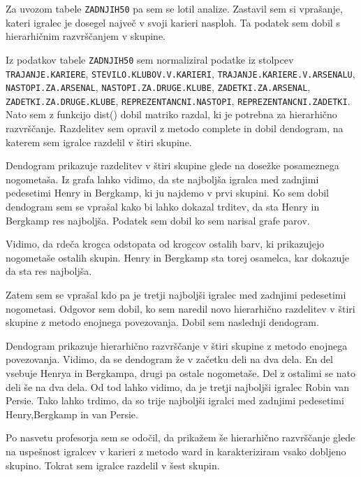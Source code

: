 \documentclass[11pt,a4paper]{article}
\begin{document}
Za uvozom tabele \verb|ZADNJIH50| pa sem se lotil analize. Zastavil sem si vprašanje, kateri igralec je dosegel največ v svoji karieri nasploh. Ta podatek sem dobil s hierarhičnim razvrščanjem v skupine.

Iz podatkov tabele \verb|ZADNJIH50| sem normaliziral podatke iz stolpcev \verb|TRAJANJE.KARIERE|, \verb|STEVILO.KLUBOV.V.KARIERI|, \verb|TRAJANJE.KARIERE.V.ARSENALU|, \verb|NASTOPI.ZA.ARSENAL|, \verb|NASTOPI.ZA.DRUGE.KLUBE|, \verb|ZADETKI.ZA.ARSENAL|,  \verb|ZADETKI.ZA.DRUGE.KLUBE|, \verb|REPREZENTANCNI.NASTOPI|, \verb|REPREZENTANCNI.ZADETKI|. Nato sem z funkcijo dist() dobil matriko razdal, ki je potrebna za hierarhično razvrščanje. Razdelitev sem opravil z metodo complete in dobil dendogram, na katerem sem igralce razdelil v štiri skupine.


Dendogram  prikazuje razdelitev v štiri skupine glede na dosežke posameznega nogometaša.
Iz grafa lahko vidimo, da ste najboljša igralca med zadnjimi pedesetimi Henry in Bergkamp, ki ju najdemo v prvi skupini. 
\newpage
\indent Ko sem dobil dendogram sem se vprašal kako bi lahko dokazal trditev, da sta Henry in Bergkamp res najboljša. Podatek sem dobil ko sem narisal grafe parov.


Vidimo, da rdeča krogca odstopata od krogcov ostalih barv, ki prikazujejo nogometaše ostalih skupin. Henry in Bergkamp sta torej osamelca, kar dokazuje da sta res najboljša.
\newpage

Zatem sem se vprašal kdo pa je tretji najboljši igralec med zadnjimi pedesetimi nogometasi. Odgovor sem dobil, ko sem naredil novo hierarhično razdelitev v štiri skupine z metodo enojnega povezovanja. Dobil sem naslednji dendogram.


Dendogram prikazuje hierarhično razvrščanje v štiri skupine z metodo enojnega povezovanja. Vidimo, da se dendogram že v začetku deli na dva dela. En del vsebuje Henrya in Bergkampa, drugi pa ostale nogometaše. Del z ostalimi se nato deli še na dva dela. Od tod lahko vidimo, da je tretji najboljši igralec Robin van Persie. Tako lahko trdimo, da so trije najboljši igralci med zadnjimi pedesetimi Henry,Bergkamp in van Persie.

\newpage
Po nasvetu profesorja sem se odočil, da prikažem še hierarhično razvrščanje glede na uspešnost igralcev v karieri z metodo ward in karakteriziram vsako dobljeno skupino. Tokrat sem igralce razdelil v šest skupin.

\end{document}
